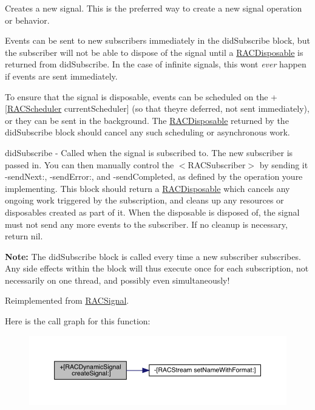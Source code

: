 Creates a new signal. This is the preferred way to create a new signal operation or behavior.

Events can be sent to new subscribers immediately in the {\ttfamily did\+Subscribe} block, but the subscriber will not be able to dispose of the signal until a \mbox{\hyperlink{interface_r_a_c_disposable}{R\+A\+C\+Disposable}} is returned from {\ttfamily did\+Subscribe}. In the case of infinite signals, this won\textquotesingle{}t {\itshape ever} happen if events are sent immediately.

To ensure that the signal is disposable, events can be scheduled on the +\mbox{[}\mbox{\hyperlink{interface_r_a_c_scheduler}{R\+A\+C\+Scheduler}} current\+Scheduler\mbox{]} (so that they\textquotesingle{}re deferred, not sent immediately), or they can be sent in the background. The \mbox{\hyperlink{interface_r_a_c_disposable}{R\+A\+C\+Disposable}} returned by the {\ttfamily did\+Subscribe} block should cancel any such scheduling or asynchronous work.

did\+Subscribe -\/ Called when the signal is subscribed to. The new subscriber is passed in. You can then manually control the $<$\+R\+A\+C\+Subscriber$>$ by sending it -\/send\+Next\+:, -\/send\+Error\+:, and -\/send\+Completed, as defined by the operation you\textquotesingle{}re implementing. This block should return a \mbox{\hyperlink{interface_r_a_c_disposable}{R\+A\+C\+Disposable}} which cancels any ongoing work triggered by the subscription, and cleans up any resources or disposables created as part of it. When the disposable is disposed of, the signal must not send any more events to the {\ttfamily subscriber}. If no cleanup is necessary, return nil.

{\bfseries Note\+:} The {\ttfamily did\+Subscribe} block is called every time a new subscriber subscribes. Any side effects within the block will thus execute once for each subscription, not necessarily on one thread, and possibly even simultaneously! 

Reimplemented from \mbox{\hyperlink{interface_r_a_c_signal_a4ba374f148d6e2a0339c4f4202b4dc26}{R\+A\+C\+Signal}}.

Here is the call graph for this function\+:\nopagebreak
\begin{figure}[H]
\begin{center}
\leavevmode
\includegraphics[width=350pt]{interface_r_a_c_dynamic_signal_aeffa754150754dd6296d5225b5c9c7fe_cgraph}
\end{center}
\end{figure}
\mbox{\label{interface_r_a_c_dynamic_signal_aeffa754150754dd6296d5225b5c9c7fe}} 
